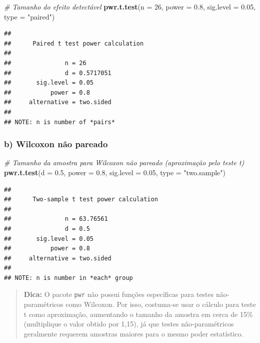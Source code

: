 \documentclass[
]{book}
\newenvironment{Shaded}{\begin{snugshade}}{\end{snugshade}}
\newcommand{\AttributeTok}[1]{\textcolor[rgb]{0.13,0.29,0.53}{#1}}
\newcommand{\CommentTok}[1]{\textcolor[rgb]{0.56,0.35,0.01}{\textit{#1}}}
\newcommand{\DecValTok}[1]{\textcolor[rgb]{0.00,0.00,0.81}{#1}}
\newcommand{\FloatTok}[1]{\textcolor[rgb]{0.00,0.00,0.81}{#1}}
\newcommand{\FunctionTok}[1]{\textcolor[rgb]{0.13,0.29,0.53}{\textbf{#1}}}
\newcommand{\NormalTok}[1]{#1}
\newcommand{\StringTok}[1]{\textcolor[rgb]{0.31,0.60,0.02}{#1}}
\begin{document}
\begin{Shaded}
\begin{Highlighting}[]
\CommentTok{\# Tamanho do efeito detectável}
\FunctionTok{pwr.t.test}\NormalTok{(}\AttributeTok{n =} \DecValTok{26}\NormalTok{, }\AttributeTok{power =} \FloatTok{0.8}\NormalTok{, }\AttributeTok{sig.level =} \FloatTok{0.05}\NormalTok{, }\AttributeTok{type =} \StringTok{"paired"}\NormalTok{)}
\end{Highlighting}
\end{Shaded}

\begin{verbatim}
## 
##      Paired t test power calculation 
## 
##               n = 26
##               d = 0.5717051
##       sig.level = 0.05
##           power = 0.8
##     alternative = two.sided
## 
## NOTE: n is number of *pairs*
\end{verbatim}

\subsubsection{b) Wilcoxon não pareado}\label{b-wilcoxon-nuxe3o-pareado}

\begin{Shaded}
\begin{Highlighting}[]
\CommentTok{\# Tamanho da amostra para Wilcoxon não pareado (aproximação pelo teste t)}
\FunctionTok{pwr.t.test}\NormalTok{(}\AttributeTok{d =} \FloatTok{0.5}\NormalTok{, }\AttributeTok{power =} \FloatTok{0.8}\NormalTok{, }\AttributeTok{sig.level =} \FloatTok{0.05}\NormalTok{, }\AttributeTok{type =} \StringTok{"two.sample"}\NormalTok{)}
\end{Highlighting}
\end{Shaded}

\begin{verbatim}
## 
##      Two-sample t test power calculation 
## 
##               n = 63.76561
##               d = 0.5
##       sig.level = 0.05
##           power = 0.8
##     alternative = two.sided
## 
## NOTE: n is number in *each* group
\end{verbatim}

\begin{quote}
\textbf{Dica:} O pacote \texttt{pwr} não possui funções específicas para testes não-paramétricos como Wilcoxon. Por isso, costuma-se usar o cálculo para teste t como aproximação, aumentando o tamanho da amostra em cerca de 15\% (multiplique o valor obtido por 1,15), já que testes não-paramétricos geralmente requerem amostras maiores para o mesmo poder estatístico.
\end{quote}
\end{document}

